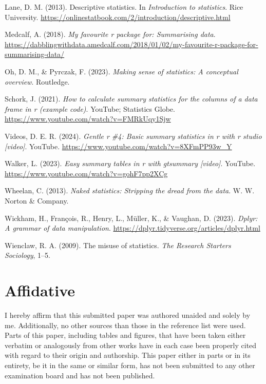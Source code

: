 \documentclass[
  man,
  floatsintext,
  longtable,
  nolmodern,
  notxfonts,
  notimes,
  colorlinks=true,linkcolor=blue,citecolor=blue,urlcolor=blue]{apa7}
\newlength{\cslhangindent}
\newenvironment{CSLReferences}[2] %
 {\begin{list}{}{%
  \setlength{\itemindent}{0pt}
  \setlength{\leftmargin}{0pt}
  \setlength{\parsep}{0pt}
  \ifodd #1
   \setlength{\leftmargin}{\cslhangindent}
   \setlength{\itemindent}{-1\cslhangindent}
  \fi
  \setlength{\itemsep}{#2\baselineskip}}}
 {\end{list}}
\begin{document}
\label{refs}
\begin{CSLReferences}{1}{0}
Lane, D. M. (2013). Descriptive statistics. In \emph{Introduction to
statistics}. Rice University.
\url{https://onlinestatbook.com/2/introduction/descriptive.html}

Medcalf, A. (2018). \emph{My favourite r package for: Summarising data}.
\url{https://dabblingwithdata.amedcalf.com/2018/01/02/my-favourite-r-package-for-summarising-data/}

Oh, D. M., \& Pyrczak, F. (2023). \emph{Making sense of statistics: A
conceptual overview}. Routledge.

Schork, J. (2021). \emph{How to calculate summary statistics for the
columns of a data frame in r (example code)}. YouTube; Statistics Globe.
\url{https://www.youtube.com/watch?v=FMRkUqy1Sjw}

Videos, D. E. R. (2024). \emph{Gentle r \#4: Basic summary statistics in
r with r studio {[}video{]}}. YouTube.
\url{https://www.youtube.com/watch?v=8XFmPP93w_Y}

Walker, L. (2023). \emph{Easy summary tables in r with gtsummary
{[}video{]}}. YouTube. \url{https://www.youtube.com/watch?v=gohF7pp2XCg}

Wheelan, C. (2013). \emph{Naked statistics: Stripping the dread from the
data}. W. W. Norton \& Company.

Wickham, H., François, R., Henry, L., Müller, K., \& Vaughan, D. (2023).
\emph{Dplyr: A grammar of data manipulation}.
\url{https://dplyr.tidyverse.org/articles/dplyr.html}

Wienclaw, R. A. (2009). The misuse of statistics. \emph{The Research
Starters Sociology}, 1--5.

\end{CSLReferences}

\newpage

\section{Affidative}\label{affidative}

I hereby affirm that this submitted paper was authored unaided and
solely by me. Additionally, no other sources than those in the reference
list were used. Parts of this paper, including tables and figures, that
have been taken either verbatim or analogously from other works have in
each case been properly cited with regard to their origin and
authorship. This paper either in parts or in its entirety, be it in the
same or similar form, has not been submitted to any other examination
board and has not been published.
\end{document}
